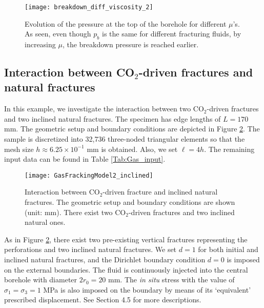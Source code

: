 
\begin{figure}[htbp]
    \centering
    \texttt{[image: breakdown\_diff\_viscosity\_2]}
         \caption{Evolution of the pressure at the top of the borehole for different $\mu$'s. As seen, even though $p_b$ is the same for different fracturing fluids, by increasing $\mu$, the breakdown pressure is reached earlier.}
    \label{Fig:Gas_Pressure_viscosity}
\end{figure}

\subsection{{Interaction between CO$_{2}$-driven fractures and natural fractures}} \label{sec: co2_interaction_inclined_ex}

{In this example, we investigate the interaction between two CO$_{2}$-driven fractures and two inclined natural fractures. The specimen has edge lengths of $L=170$ mm. The geometric setup and boundary conditions are depicted in Figure \ref{Fig:Gas_geometry_interaction}. The sample is discretized into 32,736 three-noded triangular elements so that the mesh size $h\approx 6.25 \times 10^{-1}$ mm is obtained. Also, we set $\ell=4h$. The remaining input data can be found in Table \ref{Tab:Gas_input}.}

\begin{figure}[htbp]
	\centering
	\texttt{[image: GasFrackingModel2\_inclined]}
	\caption{{Interaction between CO$_{2}$-driven fracture and inclined natural fractures. The geometric setup and boundary conditions are shown (unit: mm). There exist two CO$_2$-driven fractures and two inclined natural ones.}}
	\label{Fig:Gas_geometry_interaction}
\end{figure}

{As in Figure \ref{Fig:Gas_geometry_interaction}, there exist two pre-existing vertical fractures representing the perforations and two inclined natural fractures. We set $d=1$ for both initial and inclined natural fractures, and the Dirichlet boundary condition $d=0$ is imposed on the external boundaries. The fluid is continuously injected into the central borehole with diameter $2r_0=20$ mm. The \emph{in situ} stress {with the value of $\sigma_1=\sigma_3=1$ MPa} is also imposed on the boundary by means of its `equivalent' prescribed displacement. See Section 4.5 for more descriptions.}

